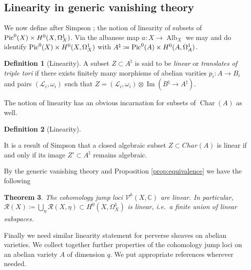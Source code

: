 \documentclass[12pt,reqno]{amsart}
\newtheorem{theorem}{Theorem}[section]
\theoremstyle{question}
\theoremstyle{definition}
\newtheorem{definition}[theorem]{Definition}
\theoremstyle{remark}
\theoremstyle{cited}
\theoremstyle{citeddef}
\DeclareMathOperator{\Alb}{Alb}
\DeclareMathOperator{\Char}{Char}
\DeclareMathOperator{\im}{Im}
\def\Pic{{\rm Pic}}
\newcommand{\sL}{\mathcal{L}}
\newcommand{\sR}{\mathcal{R}}
\newcommand\sV{{\mathcal V}}
\newcommand{\bbC}{\mathbb{C}}
\begin{document}
\subsection{Linearity in generic vanishing theory}
We now define after Simpson \cite[p.\ 365]{Sim93}; the notion of linearity of subsets of 
$\Pic^0(X)\times H^0(X,\Omega_X^1)$. Via the albanese
map $a\colon X\to \Alb_X$ we may and do identify
$\Pic^0(X)\times H^0(X,\Omega_X^1)$ with
$A^{\natural} \coloneqq \Pic^0(A)\times H^0(A,\Omega_A^1)$.
\begin{definition}[Linearity]\label{def:linhiggs}
A subset $Z\subset A^{\natural}$ is said to be \textsl{linear}
or \textsl{translates of triple tori}
if there exists finitely many morphisms of abelian varities
$p_i\colon A\to B_i$ and pairs $(\sL_i,\omega_i)$
such that $Z= (\sL_i,\omega_i)\otimes \im(B^{\natural}
\to A^{\natural})$.
\end{definition}

The notion of linearity has an obvious incarnation for subsets of
 $\Char(A)$ as well. 
\begin{definition}[Linearity]\label{def:char}

\end{definition}

It is a result of Simpson \cite[Theorem 3.1]{Sim93} that a closed algebraic subset $Z \subset Char(A)$ is linear if and only if its image $Z'\subset A^{\natural}$ remains algebraic. 


By the generic vanishing theory \cite{Ara92} and Proposition
\ref{prop:equivalence}
we have the following
\begin{theorem}
The cohomology jump loci $\sV^k(X, \bbC)$ are linear. In particular, $\sR(X)\coloneqq \bigcup_{\eta}\sR(X,\eta)\subset H^0(X,\Omega_X^1)$ is linear, i.e.\ a finite union of linear subspaces.
\label{thm:}
\end{theorem} 

Finally we need similar linearity statement
for perverse sheaves on abelian varieties. 
We collect together further properties of the
cohomology jump loci on an abelian variety $A$ of dimension $q$.
We put appropriate references wherever needed.
\end{document}
